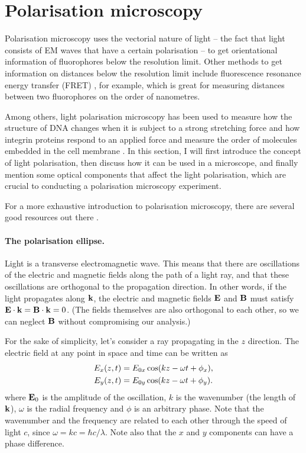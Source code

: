 \section{Polarisation microscopy}

Polarisation microscopy uses the vectorial nature of light -- the fact that light consists of EM waves that have a certain polarisation -- to get orientational information of fluorophores below the resolution limit. Other methods to get information on distances below the resolution limit  include fluorescence resonance energy transfer (FRET) \cite{Lerner2021}, for example, which is great for measuring distances between two fluorophores on the order of nanometres.

Among others, light polarisation microscopy has been used to measure how the structure of DNA changes when it is subject to a strong stretching force and how integrin proteins respond to an applied force and measure the order of molecules embedded in the cell membrane \cite{Backer2019, Nordenfelt2017, Swaminathan2017, Brasselet2013}. In this section, I will first introduce the concept of light polarisation, then discuss how it can be used in a microscope, and finally mention some optical components that affect the light polarisation, which are crucial to conducting a polarisation microscopy experiment.

For a more exhaustive introduction to polarisation microscopy, there are several good resources out there \cite{Goldstein2011, Collett2005, Lakowicz2006}.

\paragraph{The polarisation ellipse.} Light is a transverse electromagnetic wave. This means that there are oscillations of the electric and magnetic fields along the path of a light ray, and that these oscillations are orthogonal to the propagation direction. In other words, if the light propagates along $\vb{k}$, the electric and magnetic fields $\vb{E}$ and $\vb{B}$ must satisfy $ \vb{E} \cdot \vb{k} = \vb{B} \cdot \vb{k} = 0$. (The fields themselves are also orthogonal to each other, so we can neglect $ \vb{B} $ without compromising our analysis.)

For the sake of simplicity, let's consider a ray propagating in the $ z $ direction. The electric field at any point in space and time can be written as
\begin{align}
	E_x(z, t) &= E_{0x} \cos(kz-\omega t + \phi_x),\\
	E_y(z, t) &= E_{0y} \cos(kz-\omega t + \phi_y).
\end{align}
where $ \vb{E}_0 $ is the amplitude of the oscillation, $ k $ is the wavenumber (the length of $ \vb{k} $), $ \omega $ is the radial frequency and $ \phi $ is an arbitrary phase. Note that the wavenumber and the frequency are related to each other through the speed of light $ c $, since $ \omega = kc = \hbar c/\lambda$. Note also that the $ x $ and $ y $ components can have a phase difference.

